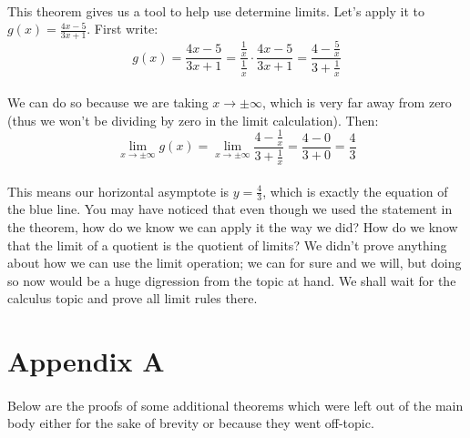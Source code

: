 \documentclass[12pt, a4paper, titlepage, twoside]{article}
\begin{document}
	\paragraph{}
	This theorem gives us a tool to help use determine limits. Let's apply it to $g(x) = \frac{4x-5}{3x+1}$. First write:
	\[ g(x) = \dfrac{4x-5}{3x+1} = \dfrac{\tfrac{1}{x}}{\tfrac{1}{x}} \cdot \dfrac{4x-5}{3x+1} = \dfrac{4-\tfrac{5}{x}}{3+\tfrac{1}{x}} \]
	
	\paragraph{}
	We can do so because we are taking $x \to \pm \infty$, which is very far away from zero (thus we won't be dividing by zero in the limit
	calculation). Then:
	\[ \lim_{x \to \pm \infty} g(x) = \lim_{x \to \pm \infty} \dfrac{4-\tfrac{1}{x}}{3+\tfrac{1}{x}} = \dfrac{4-0}{3+0} = \dfrac{4}{3} \]
	
	\paragraph{}
	This means our horizontal asymptote is $y = \frac{4}{3}$, which is exactly the equation of the blue line. You may have noticed that
	even though we used the statement in the theorem, how do we know we can apply it the way we did? How do we know that the limit
	of a quotient is the quotient of limits? We didn't prove anything about how we can use the limit operation; we can for sure and we will,
	but doing so now would be a huge digression from the topic at hand. We shall wait for the calculus topic and prove all limit rules there.
	
	\paragraph{}
	
		
\newpage
	
\section{Appendix A}

	\paragraph{}
	Below are the proofs of some additional theorems which were left out of the main body either for the sake of brevity or because they
	went off-topic.\\
\end{document}
